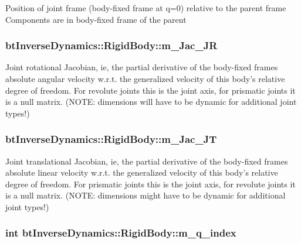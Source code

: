 Position of joint frame (body-fixed frame at q=0) relative to the parent frame Components are in body-fixed frame of the parent \hypertarget{structbt_inverse_dynamics_1_1_rigid_body_5ce5299988e53be540fa03c23b8bb63e}{
\subsubsection[m\_\-Jac\_\-JR]{ {\bf btInverseDynamics::RigidBody::m\_\-Jac\_\-JR}}}
\label{structbt_inverse_dynamics_1_1_rigid_body_5ce5299988e53be540fa03c23b8bb63e}


Joint rotational Jacobian, ie, the partial derivative of the body-fixed frames absolute angular velocity w.r.t. the generalized velocity of this body's relative degree of freedom. For revolute joints this is the joint axis, for prismatic joints it is a null matrix. (NOTE: dimensions will have to be dynamic for additional joint types!) \hypertarget{structbt_inverse_dynamics_1_1_rigid_body_cedf67bbb73601a34c2909136fae1187}{
\subsubsection[m\_\-Jac\_\-JT]{ {\bf btInverseDynamics::RigidBody::m\_\-Jac\_\-JT}}}
\label{structbt_inverse_dynamics_1_1_rigid_body_cedf67bbb73601a34c2909136fae1187}


Joint translational Jacobian, ie, the partial derivative of the body-fixed frames absolute linear velocity w.r.t. the generalized velocity of this body's relative degree of freedom. For prismatic joints this is the joint axis, for revolute joints it is a null matrix. (NOTE: dimensions might have to be dynamic for additional joint types!) \hypertarget{structbt_inverse_dynamics_1_1_rigid_body_33784734bb817b0f117e5cc59f8e2d07}{
\subsubsection[m\_\-q\_\-index]{\setlength{\rightskip}{0pt plus 5cm}int {\bf btInverseDynamics::RigidBody::m\_\-q\_\-index}}}
\label{structbt_inverse_dynamics_1_1_rigid_body_33784734bb817b0f117e5cc59f8e2d07}



